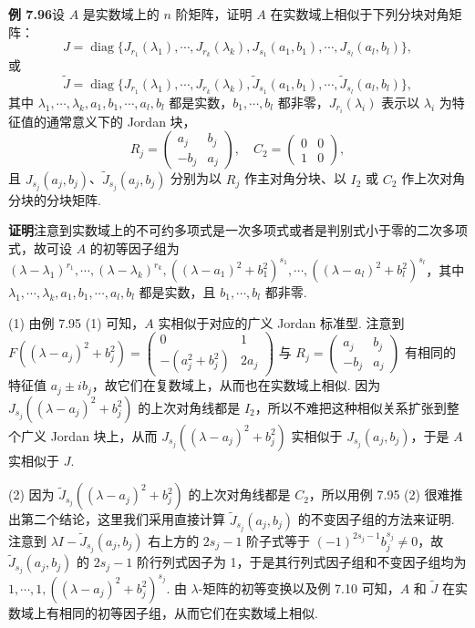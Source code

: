 \documentclass[UTF8, 12pt, fontset=fandol, oneside]{ctexart}
\begin{document}
\noindent\textbf{例 7.96}\quad 设 $A$ 是实数域上的 $n$ 阶矩阵，证明 $A$ 在实数域上相似于下列分块对角矩阵：
\[
J=\operatorname{diag}\{J_{r_1}(\lambda_1),\cdots,J_{r_k}(\lambda_k),J_{s_1}(a_1,b_1),\cdots,J_{s_l}(a_l,b_l)\},
\]
或
\[
\widetilde J=\operatorname{diag}\{J_{r_1}(\lambda_1),\cdots,J_{r_k}(\lambda_k),\widetilde J_{s_1}(a_1,b_1),\cdots,\widetilde J_{s_l}(a_l,b_l)\},
\]
其中 $\lambda_1,\cdots,\lambda_k,a_1,b_1,\cdots,a_l,b_l$ 都是实数，$b_1,\cdots,b_l$ 都非零，$J_{r_i}(\lambda_i)$ 表示以 $\lambda_i$ 为特征值的通常意义下的 Jordan 块，
\[
R_j=\left(\begin{array}{rr}a_j&b_j\\-b_j&a_j\end{array}\right),\quad C_2=\left(\begin{array}{cc}0&0\\1&0\end{array}\right),
\]
且 $J_{s_j}(a_j,b_j)$、$\widetilde J_{s_j}(a_j,b_j)$ 分别为以 $R_j$ 作主对角分块、以 $I_2$ 或 $C_2$ 作上次对角分块的分块矩阵.

\noindent\textbf{证明}\quad 注意到实数域上的不可约多项式是一次多项式或者是判别式小于零的二次多项式，故可设 $A$ 的初等因子组为 $(\lambda-\lambda_1)^{r_1},\cdots,(\lambda-\lambda_k)^{r_k},((\lambda-a_1)^2+b_1^2)^{s_1},\cdots,((\lambda-a_l)^2+b_l^2)^{s_l}$，其中 $\lambda_1,\cdots,\lambda_k,a_1,b_1,\cdots,a_l,b_l$ 都是实数，且 $b_1,\cdots,b_l$ 都非零.

(1) 由例 7.95 (1) 可知，$A$ 实相似于对应的广义 Jordan 标准型. 注意到 $F((\lambda-a_j)^2+b_j^2)=\left(\begin{array}{cc}0&1\\-(a_j^2+b_j^2)&2a_j\end{array}\right)$ 与 $R_j=\left(\begin{array}{rr}a_j&b_j\\-b_j&a_j\end{array}\right)$ 有相同的特征值 $a_j\pm ib_j$，故它们在复数域上，从而也在实数域上相似. 因为 $J_{s_j}((\lambda-a_j)^2+b_j^2)$ 的上次对角线都是 $I_2$，所以不难把这种相似关系扩张到整个广义 Jordan 块上，从而 $J_{s_j}((\lambda-a_j)^2+b_j^2)$ 实相似于 $J_{s_j}(a_j,b_j)$，于是 $A$ 实相似于 $J$.

(2) 因为 $\widetilde J_{s_j}((\lambda-a_j)^2+b_j^2)$ 的上次对角线都是 $C_2$，所以用例 7.95 (2) 很难推出第二个结论，这里我们采用直接计算 $\widetilde J_{s_j}(a_j,b_j)$ 的不变因子组的方法来证明. 注意到 $\lambda I-\widetilde J_{s_j}(a_j,b_j)$ 右上方的 $2s_j-1$ 阶子式等于 $(-1)^{2s_j-1}b_j^{s_j}\ne0$，故 $\widetilde J_{s_j}(a_j,b_j)$ 的 $2s_j-1$ 阶行列式因子为 1，于是其行列式因子组和不变因子组均为 $1,\cdots,1,((\lambda-a_j)^2+b_j^2)^{s_j}$. 由 $\lambda$-矩阵的初等变换以及例 7.10 可知，$A$ 和 $\widetilde J$ 在实数域上有相同的初等因子组，从而它们在实数域上相似.
\end{document}
